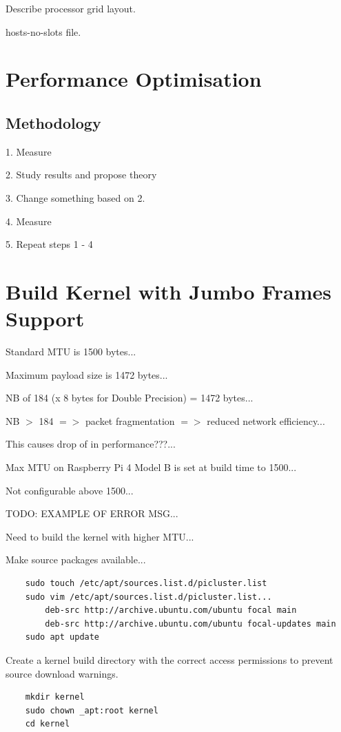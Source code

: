 \documentclass{article}
\begin{document}
Describe processor grid layout.

hosts-no-slots file.

%
%
\section{Performance Optimisation}


\subsection{Methodology}
1. Measure

2. Study results and propose theory

3. Change something based on 2.

4. Measure

5. Repeat steps 1 - 4


%
%
\section{Build Kernel with Jumbo Frames Support}

Standard MTU is 1500 bytes...

Maximum payload size is 1472 bytes...

NB of 184 (x 8 bytes for Double Precision) = 1472 bytes...

NB $>$ 184 $=>$ packet fragmentation $=>$ reduced network efficiency...

This causes drop of in performance???...

Max MTU on Raspberry Pi 4 Model B is set at build time to 1500...

Not configurable above 1500...

TODO: EXAMPLE OF ERROR MSG...

Need to build the kernel with higher MTU...


Make source packages available...

\begin{verbatim}
    sudo touch /etc/apt/sources.list.d/picluster.list
    sudo vim /etc/apt/sources.list.d/picluster.list...
        deb-src http://archive.ubuntu.com/ubuntu focal main
        deb-src http://archive.ubuntu.com/ubuntu focal-updates main
    sudo apt update
\end{verbatim}

Create a kernel build directory with the correct access permissions to prevent source download warnings. 

\begin{verbatim}
    mkdir kernel
    sudo chown _apt:root kernel
    cd kernel
\end{verbatim}
\end{document}
